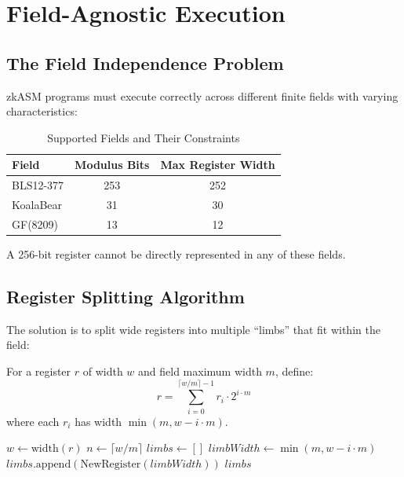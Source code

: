 \documentclass[11pt,a4paper]{article}
\begin{document}
\section{Field-Agnostic Execution}

\subsection{The Field Independence Problem}

zkASM programs must execute correctly across different finite fields with varying characteristics:

\begin{table}[h]
\centering
\begin{tabular}{lcc}
\toprule
\textbf{Field} & \textbf{Modulus Bits} & \textbf{Max Register Width} \\
\midrule
BLS12-377 & 253 & 252 \\
KoalaBear & 31 & 30 \\
GF(8209) & 13 & 12 \\
\bottomrule
\end{tabular}
\caption{Supported Fields and Their Constraints}
\end{table}

A 256-bit register cannot be directly represented in any of these fields.

\subsection{Register Splitting Algorithm}

The solution is to split wide registers into multiple ``limbs'' that fit within the field:

\begin{definition}
For a register $r$ of width $w$ and field maximum width $m$, define:
\begin{equation}
r = \sum_{i=0}^{\lceil w/m \rceil - 1} r_i \cdot 2^{i \cdot m}
\end{equation}
where each $r_i$ has width $\min(m, w - i \cdot m)$.
\end{definition}

\begin{algorithm}
\caption{Register Splitting Environment}
\begin{algorithmic}[1]
    \State $w \gets \text{width}(r)$
    \State $n \gets \lceil w / m \rceil$
    \State $limbs \gets []$
        \State $limbWidth \gets \min(m, w - i \cdot m)$
        \State $limbs.\text{append}(\text{NewRegister}(limbWidth))$
    \EndFor
    \State \Return $limbs$
\EndFunction
\end{algorithmic}
\end{algorithm}
\end{document}
